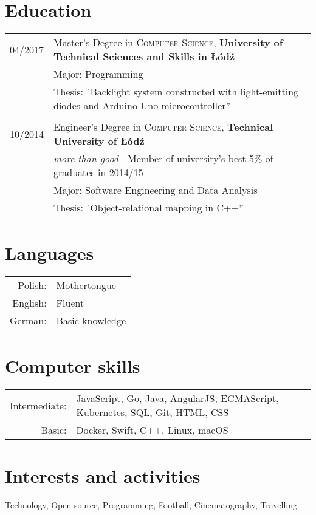 \documentclass[a4paper,10pt]{article}
\begin{document}
\section{Education}

\begin{tabular}{rl}	

04/2017 & Master's Degree in \textsc{Computer Science}, \textbf{University of Technical Sciences and Skills in Łódź} \\
& \small  Major: Programming\\
& \small Thesis: "Backlight system constructed with light-emitting diodes and Arduino Uno microcontroller'' \\&\\

10/2014 & Engineer's Degree in \textsc{Computer Science}, \textbf{Technical University of Łódź} \\
& \small\emph{more than good} | Member of university’s best 5\% of graduates in 2014/15\\
& \small  Major: Software Engineering and Data Analysis \\
& \small Thesis: "Object-relational mapping in C++'' \\

\end{tabular}

\section{Languages}

\begin{tabular}{rl}
	Polish: & Mothertongue\\
	English: & Fluent\\
	German: & Basic knowledge\\
\end{tabular}

\section{Computer skills}
\begin{tabular}{rl}
	Intermediate: & JavaScript, Go, Java, AngularJS, ECMAScript, Kubernetes, SQL, Git, HTML, CSS \\
	Basic: & Docker, Swift, C++, Linux, macOS \\
\end{tabular}

\section{Interests and activities}
Technology, Open-source, Programming, Football, Cinematography, Travelling
\end{document}
